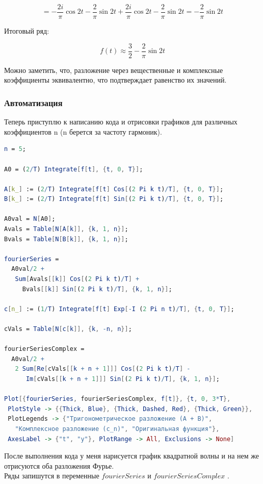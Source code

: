 \documentclass[a4paper,12pt]{article}
\begin{document}
\[
= -\frac{2i}{\pi} \cos 2t - \frac{2}{\pi} \sin 2t + \frac{2i}{\pi} \cos 2t - \frac{2}{\pi} \sin 2t = -\frac{2}{\pi} \sin 2t
\]

Итоговый ряд:

\[
f(t) \approx \frac{3}{2} - \frac{2}{\pi} \sin 2t
\]


Можно заметить, что, разложение через вещественные и комплексные коэффициенты эквивалентно, что подтверждает равенство их значений.



\subsubsection{Автоматизация}

Теперь приступлю к написанию кода и отрисовки графиков для различных коэффициентов n (n берется за частоту гармоник).




\begin{lstlisting}[language=Mathematica, caption={Код для квадратной волны}]
n = 5;

A0 = (2/T) Integrate[f[t], {t, 0, T}];

A[k_] := (2/T) Integrate[f[t] Cos[(2 Pi k t)/T], {t, 0, T}];
B[k_] := (2/T) Integrate[f[t] Sin[(2 Pi k t)/T], {t, 0, T}];

A0val = N[A0];
Avals = Table[N[A[k]], {k, 1, n}];
Bvals = Table[N[B[k]], {k, 1, n}];

fourierSeries = 
  A0val/2 + 
   Sum[Avals[[k]] Cos[(2 Pi k t)/T] + 
     Bvals[[k]] Sin[(2 Pi k t)/T], {k, 1, n}];

c[n_] := (1/T) Integrate[f[t] Exp[-I (2 Pi n t)/T], {t, 0, T}];

cVals = Table[N[c[k]], {k, -n, n}];

fourierSeriesComplex = 
  A0val/2 + 
   2 Sum[Re[cVals[[k + n + 1]]] Cos[(2 Pi k t)/T] - 
      Im[cVals[[k + n + 1]]] Sin[(2 Pi k t)/T], {k, 1, n}];

Plot[{fourierSeries, fourierSeriesComplex, f[t]}, {t, 0, 3*T}, 
 PlotStyle -> {{Thick, Blue}, {Thick, Dashed, Red}, {Thick, Green}}, 
 PlotLegends -> {"Тригонометрическое разложение (A + B)", 
   "Комплексное разложение (c_n)", "Оригинальная функция"}, 
 AxesLabel -> {"t", "y"}, PlotRange -> All, Exclusions -> None]

\end{lstlisting}

После выполнения кода у меня нарисуется график квадратной волны и на нем же отрисуются оба разложения Фурье. \\
Ряды запишутся в переменные \( fourierSeries\) и \( fourierSeriesComplex \) .
\end{document}
